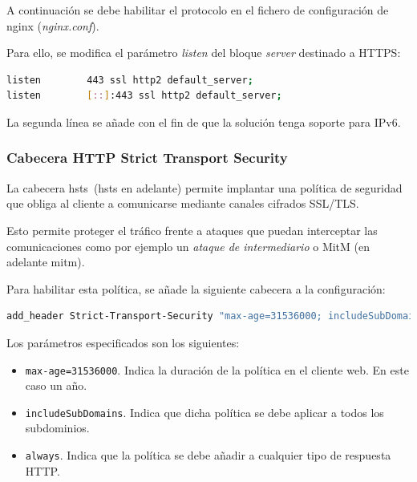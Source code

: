 \par A continuación se debe  habilitar el protocolo en el fichero de configuración de nginx ({\em nginx.conf}).
\par Para ello, se modifica el parámetro {\em listen} del bloque {\em server} destinado a HTTPS:
\begin{lstlisting}[language=bash]
listen        443 ssl http2 default_server;
listen        [::]:443 ssl http2 default_server;
\end{lstlisting}

\par La segunda línea se añade con el fin de que la solución tenga soporte para IPv6.

\subsubsection{Cabecera HTTP Strict Transport Security}
\par La cabecera \acrlong{hsts}~\cite{wiki:hsts}(\acrshort{hsts} en adelante) permite implantar una política de seguridad que obliga al cliente a comunicarse mediante canales cifrados SSL/TLS.
\par Esto permite proteger el tráfico frente a ataques que puedan interceptar las comunicaciones como por ejemplo un {\em ataque de intermediario} o \gls{MitM} (en adelante \acrshort{mitm}).
\par Para habilitar esta política, se añade la siguiente cabecera a la configuración:
\begin{lstlisting}[language=bash]
add_header Strict-Transport-Security "max-age=31536000; includeSubDomains" always;
\end{lstlisting}
\par Los parámetros especificados son los siguientes:
\begin{itemize}
\item  \lstinline{max-age=31536000}. Indica la duración de la política en el cliente web. En este caso un año.
\item  \lstinline{includeSubDomains}. Indica que dicha política se debe aplicar a todos los subdominios.
\item  \lstinline{always}. Indica que la política se debe añadir a cualquier tipo de respuesta HTTP.
\end{itemize}

